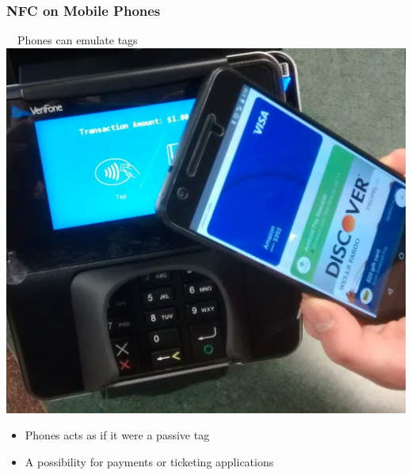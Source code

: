 \documentclass[unknownkeysallowed]{beamer}
\begin{document}
\begin{frame}
\frametitle{NFC on Mobile Phones}
  \begin{center}
  \begin{minipage}{.7\textwidth}
  \begin{block}{~~Phones can emulate tags}\centering
      \includegraphics[width=\linewidth,height=0.4\textheight,keepaspectratio]{figures/androidPay.png}
      \begin{itemize}
  		  \item{Phones acts as if it were a passive tag}
        \pause
  		  \item{A possibility for payments or ticketing applications}
     	\end{itemize}
  \end{block}
  \end{minipage}
  \end{center}
\end{frame}
\end{document}

